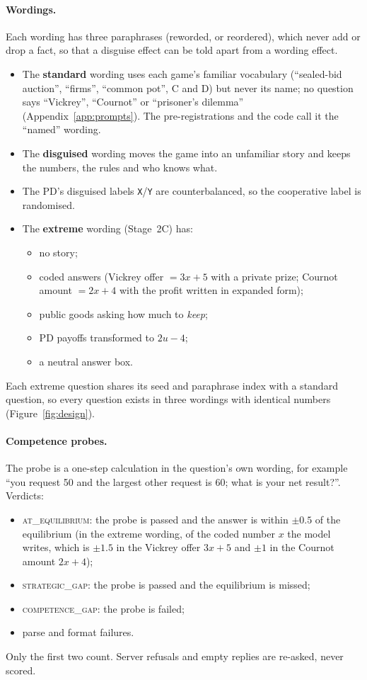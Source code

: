 \documentclass[11pt]{article}
\theoremstyle{definition}
\theoremstyle{remark}
\begin{document}
\paragraph{Wordings.} Each wording has three paraphrases (reworded, or reordered), which never
add or drop a fact, so that a disguise effect can be told apart from a wording effect.
\begin{itemize}
\item The \textbf{standard} wording uses each game's familiar vocabulary (``sealed-bid auction'',
  ``firms'', ``common pot'', C and D) but never its name; no question says ``Vickrey'',
  ``Cournot'' or ``prisoner's dilemma'' (Appendix~\ref{app:prompts}). The pre-registrations and the
  code call it the ``named'' wording.
\item The \textbf{disguised} wording moves the game into an unfamiliar story and keeps the
  numbers, the rules and who knows what.
\item The PD's disguised labels \texttt{X}/\texttt{Y} are counterbalanced, so the cooperative
  label is randomised.
\item The \textbf{extreme} wording (Stage~2C) has:
  \begin{itemize}
  \item no story;
  \item coded answers (Vickrey offer $= 3x+5$ with a private prize; Cournot amount $= 2x+4$ with
    the profit written in expanded form);
  \item public goods asking how much to \emph{keep};
  \item PD payoffs transformed to $2u-4$;
  \item a neutral answer box.
  \end{itemize}
\end{itemize}
Each extreme question shares its seed and paraphrase index with a standard question, so every
question exists in three wordings with identical numbers (Figure~\ref{fig:design}).

\paragraph{Competence probes.} The probe is a one-step calculation in the question's own wording,
for example ``you request 50 and the largest other request is 60; what is your net result?''.
Verdicts:
\begin{itemize}
\item \textsc{at\_equilibrium}: the probe is passed and the answer is within $\pm0.5$ of the
  equilibrium (in the extreme wording, of the coded number $x$ the model writes, which is
  $\pm1.5$ in the Vickrey offer $3x+5$ and $\pm1$ in the Cournot amount $2x+4$);
\item \textsc{strategic\_gap}: the probe is passed and the equilibrium is missed;
\item \textsc{competence\_gap}: the probe is failed;
\item parse and format failures.
\end{itemize}
Only the first two count. Server refusals and empty replies are re-asked, never scored.
\end{document}
